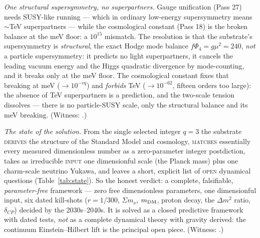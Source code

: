 \documentclass[11pt]{article}
\begin{document}
\emph{One structural supersymmetry, no superpartners.} Gauge unification (Pass 27) needs SUSY-like
running --- which in ordinary low-energy supersymmetry means $\sim$TeV superpartners --- while the
cosmological constant (Pass 18) is the broken balance at the meV floor: a $10^{15}$ mismatch. The
resolution is that the substrate's supersymmetry is \emph{structural}, the exact Hodge mode balance
$f\Phi_4=g\mu^2=240$, \emph{not} a particle supersymmetry: it predicts no light superpartners, it
cancels the leading vacuum energy and the Higgs quadratic divergence by mode-counting, and it
breaks only at the meV floor. The cosmological constant fixes that breaking at meV
($\to10^{-vq}$) and \emph{forbids} TeV ($\to10^{-62}$, fifteen orders too large): the absence of TeV
superpartners is a prediction, and the two-scale tension dissolves --- there is no particle-SUSY
scale, only the structural balance and its meV breaking. (Witness:
.)

\emph{The state of the solution.} From the single selected integer $q=3$ the substrate
\textsc{derives} the structure of the Standard Model and cosmology, \textsc{matches} essentially
every measured dimensionless number as a zero-parameter integer postdiction, takes as irreducible
\textsc{input} one dimensionful scale (the Planck mass) plus one charm-scale neutrino Yukawa, and
leaves a short, explicit list of \textsc{open} dynamical questions (Table~\ref{tab:state}). So the
honest verdict: a complete, falsifiable, \emph{parameter-free} framework --- zero free dimensionless
parameters, one dimensionful input, six dated kill-shots ($r=1/300$, $\Sigma m_\nu$, $m_{\rm DM}$,
proton decay, the $\Delta m^2$ ratio, $\delta_{CP}$) decided by the 2030s--2040s. It is solved as a
closed predictive framework with dated tests, \emph{not} as a complete dynamical theory with gravity
derived: the continuum Einstein--Hilbert lift is the principal open piece. (Witness:
.)
\end{document}
